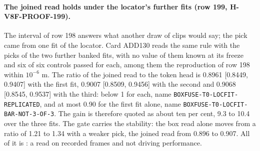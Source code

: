\paragraph{The joined read holds under the locator's further fits (row 199, H-V8F-PROOF-199).} The interval of row 198 answers what another draw of clips would say; the pick came from one fit of the locator. Card ADD130 reads the same rule with the picks of the two further banked fits, with no value of them known at its freeze and six of six controls passed for each, among them the reproduction of row 198 within $10^{-6}$ m. The ratio of the joined read to the token head is 0.8961 [0.8449, 0.9407] with the first fit, 0.9007 [0.8509, 0.9456] with the second and 0.9068 [0.8545, 0.9537] with the third: below 1 for each, name \texttt{BOXFUSE-T0-LOCFIT-REPLICATED}, and at most 0.90 for the first fit alone, name \texttt{BOXFUSE-T0-LOCFIT-BAR-NOT-3-OF-3}. The gain is therefore quoted as about ten per cent, 9.3 to 10.4 over the three fits. The gate carries the stability: the box read alone moves from a ratio of 1.21 to 1.34 with a weaker pick, the joined read from 0.896 to 0.907. All of it is : a read on recorded frames and not driving performance.
